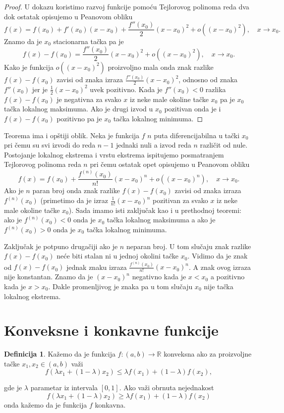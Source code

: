 \documentclass[a4paper,12pt]{article}
\theoremstyle{plain}
\theoremstyle{definition}
\newtheorem{definition}{Definicija}[section]
\theoremstyle{remark}
\begin{document}
\begin{proof}
U dokazu koristimo razvoj funkcije pomoću Tejlorovog polinoma reda dva dok ostatak opisujemo u Peanovom obliku
$$
f(x) = f(x_0) + f'(x_0)(x - x_0) + \frac{f''(x_0)}{2}(x - x_0)^2 + o((x - x_0)^2), \quad x \to x_0.
$$
Znamo da je $x_0$ stacionarna tačka pa je
$$
f(x) - f(x_0) = \frac{f''(x_0)}{2}(x - x_0)^2 + o((x - x_0)^2), \quad x \to x_0.
$$
Kako je funkcija $o((x - x_0)^2)$ proizvoljno mala onda znak razlike $f(x) - f(x_0)$ zavisi od znaka izraza $\frac{f''(x_0)}{2}(x - x_0)^2$, odnosno od znaka $f''(x_0)$ jer je $\frac{1}{2}(x - x_0)^2$ uvek pozitivno. Kada je $f''(x_0) < 0$ razlika $f(x) - f(x_0)$ je negativna za svako $x$ iz neke male okoline tačke $x_0$ pa je $x_0$ tačka lokalnog maksimuma. Ako je drugi izvod u $x_0$ pozitivan onda je i $f(x) - f(x_0)$ pozitivno pa je $x_0$ tačka lokalnog minimuma.
\end{proof}

Teorema ima i opštiji oblik. Neka je funkcija $f$ $n$ puta diferencijabilna u tački $x_0$ pri čemu su svi izvodi do reda $n-1$ jednaki nuli a izvod reda $n$ različit od nule. Postojanje lokalnog ekstrema i vrstu ekstrema ispitujemo posmatranjem Tejlorovog polinoma reda $n$ pri čemu ostatak opet opisujemo u Peanovom obliku
$$
f(x) = f(x_0) + \frac{f^{(n)}(x_0)}{n!}(x - x_0)^n + o((x - x_0)^n), \quad x \to x_0.
$$
Ako je $n$ paran broj onda znak razlike $f(x) - f(x_0)$ zavisi od znaka izraza $f^{(n)}(x_0)$ (primetimo da je izraz $\frac{1}{n!}(x - x_0)^n$ pozitivan za svako $x$ iz neke male okoline tačke $x_0$). Sada imamo isti zaključak kao i u prethodnoj teoremi: ako je $f^{(n)}(x_0) < 0$ onda je $x_0$ tačka lokalnog maksimuma a ako je $f^{(n)}(x_0) > 0$ onda je $x_0$ tačka lokalnog minimuma.

Zaključak je potpuno drugačiji ako je $n$ neparan broj. U tom slučaju znak razlike $f(x) - f(x_0)$ neće biti stalan ni u jednoj okolini tačke $x_0$. Vidimo da je znak od $f(x) - f(x_0)$ jednak znaku izraza $\frac{f^{(n)}(x_0)}{n!}(x - x_0)^n$. A znak ovog izraza nije konstantan. Znamo da je $(x - x_0)^n$ negativno kada je $x < x_0$ a pozitivno kada je $x > x_0$. Dakle promenljivog je znaka pa u tom slučaju $x_0$ nije tačka lokalnog ekstrema.

\section{Konveksne i konkavne funkcije}
\begin{definition}
Kažemo da je funkcija $f: (a, b) \to \mathbb{R}$ konveksna ako za proizvoljne tačke $x_1, x_2 \in (a, b)$ važi
\begin{equation}
    f(\lambda x_1 + (1 - \lambda)x_2) \leq \lambda f(x_1) + (1 - \lambda)f(x_2),
    \label{41-1}
\end{equation}

gde je $\lambda$ parametar iz intervala $[0, 1]$. Ako važi obrnuta nejednakost
$$
f(\lambda x_1 + (1 - \lambda)x_2) \geq \lambda f(x_1) + (1 - \lambda)f(x_2)
$$
onda kažemo da je funkcija $f$ konkavna.
\end{definition}
\end{document}
